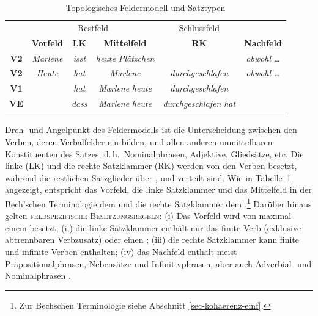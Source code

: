 \begin{table}[t]
\centering
\begin{tabular}{cccccc}
\lsptoprule
& \multicolumn{3}{c}{Restfeld} & Schlussfeld \\
\cmidrule(r){2-4}\cmidrule(lr){5-5}
& {\bf Vorfeld} & {\bf LK} & {\bf Mittelfeld} & {\bf RK} & {\bf Nachfeld} \\
\cmidrule[\heavyrulewidth]{2-6}
\textbf{V2} &{\it Marlene} & {\it isst} & {\it heute Plätzchen} & & {\it obwohl \ldots}  \\
\textbf{V2} & {\it Heute} & {\it hat} & {\it Marlene} & {\it durchgeschlafen} & {\it obwohl \ldots}  \\
\textbf{V1} & & {\it hat} & {\it Marlene} {\it heute} & {\it durchgeschlafen} &  \\
\textbf{VE} & & {\it dass} & {\it Marlene} {\it heute} & {\it durchgeschlafen} {\it hat} & \\
\lspbottomrule
\end{tabular}
\caption{\label{ex-feldermodell}Topologisches Feldermodell und Satztypen}
\end{table}

Dreh- und Angelpunkt des Feldermodells ist die Unterscheidung zwischen den Verben, deren Verbalfelder ein  bilden, und allen anderen unmittelbaren Konstituenten des Satzes, d.\,h.\ Nominalphrasen, Adjektive, Gliedsätze, etc. Die linke  (LK) und die rechte Satzklammer (RK) werden von den Verben besetzt, während die restlichen Satzglieder über ,  und  verteilt sind. Wie in Tabelle~\ref{ex-feldermodell} angezeigt, entspricht das Vorfeld, die linke Satzklammer und das Mittelfeld in der Bech'schen Terminologie dem  und die rechte Satzklammer dem .\footnote{Zur Bechschen Terminologie siehe Abschnitt \ref{sec-kohaerenz-einf}.} Darüber hinaus gelten \textsc{feldspezifische Besetzungsregeln}: (i) Das Vorfeld wird von maximal einem  besetzt; (ii) die linke Satzklammer enthält nur das finite Verb (exklusive abtrennbaren Verbzusatz) oder einen ; (iii) die rechte Satzklammer kann finite und infinite Verben enthalten; (iv) das Nachfeld enthält meist Präpositionalphrasen, Nebensätze und Infinitivphrasen, aber auch Adverbial- und Nominalphrasen \citep[Kapitel~13]{Mueller:99}.

